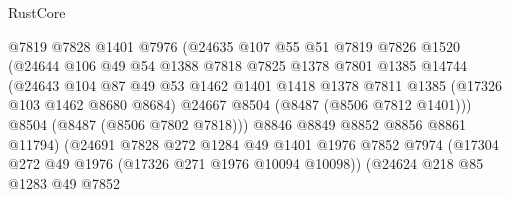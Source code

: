 \begin{lexlean}{RustCore}
\begin{coremodule}
                                @7819
                                @7828
                                @1401
                                @7976
                                (@24635
                                  @107
                                  @55
                                  @51
                                  @7819
                                  @7826
                                  @1520
                                  (@24644
                                    @106
                                    @49
                                    @54
                                    @1388
                                    @7818
                                    @7825
                                    @1378
                                    @7801
                                    @1385
                                    @14744
                                    (@24643
                                      @104
                                      @87
                                      @49
                                      @53
                                      @1462
                                      @1401
                                      @1418
                                      @1378
                                      @7811
                                      @1385
                                      (@17326 @103 @1462 @8680 @8684)
                                      @24667
                                      @8504
                                      (@8487 (@8506 @7812 @1401)))
                                    @8504
                                    (@8487 (@8506 @7802 @7818)))
                                  @8846
                                  @8849
                                  @8852
                                  @8856
                                  @8861
                                  @11794)
                                (@24691
                                  @7828
                                  @272
                                  @1284
                                  @49
                                  @1401
                                  @1976
                                  @7852
                                  @7974
                                  (@17304 @272 @49 @1976 (@17326 @271 @1976 @10094 @10098))
                                  (@24624
                                    @218
                                    @85
                                    @1283
                                    @49
                                    @7852

\end{coremodule}
\end{lexlean}
